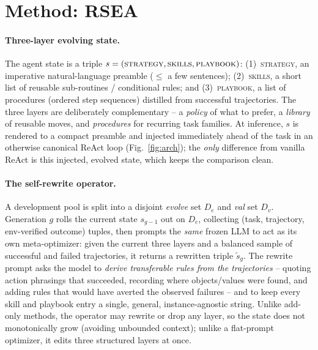 \documentclass{article}
\begin{document}
\section{Method: RSEA}
\label{sec:method}
\paragraph{Three-layer evolving state.} The agent state is a triple
$s=(\textsc{strategy}, \textsc{skills}, \textsc{playbook})$: (1)~\textsc{strategy},
an imperative natural-language preamble ($\le$ a few sentences); (2)~\textsc{skills},
a short list of reusable sub-routines / conditional rules; and (3)~\textsc{playbook},
a list of procedures (ordered step sequences) distilled from successful
trajectories. The three layers are deliberately complementary -- a \emph{policy} of
what to prefer, a \emph{library} of reusable moves, and \emph{procedures} for
recurring task families. At inference, $s$ is rendered to a compact preamble and
injected immediately ahead of the task in an otherwise canonical ReAct loop
(Fig.~\ref{fig:arch}); the \emph{only} difference from vanilla ReAct is this
injected, evolved state, which keeps the comparison clean.

\paragraph{The self-rewrite operator.} A development pool is split into a disjoint
\emph{evolve} set $D_e$ and \emph{val} set $D_v$. Generation $g$ rolls the current
state $s_{g-1}$ out on $D_e$, collecting (task, trajectory, env-verified outcome)
tuples, then prompts the \emph{same} frozen LLM to act as its own meta-optimizer:
given the current three layers and a balanced sample of successful and failed
trajectories, it returns a rewritten triple $\tilde s_g$. The rewrite prompt asks the
model to \emph{derive transferable rules from the trajectories} -- quoting action
phrasings that succeeded, recording where objects/values were found, and adding rules
that would have averted the observed failures -- and to keep every skill and playbook
entry a single, general, instance-agnostic string. Unlike add-only methods, the
operator may rewrite or drop any layer, so the state does not monotonically grow
(avoiding unbounded context); unlike a flat-prompt optimizer, it edits three
structured layers at once.
\end{document}
